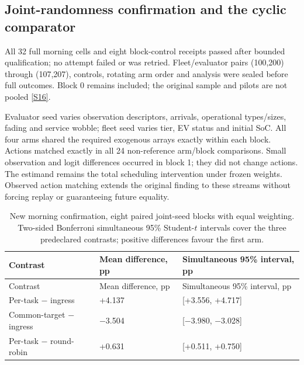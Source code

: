 \documentclass[11pt,a4paper]{article}
\begin{document}
\subsection{Joint-randomness confirmation and the cyclic comparator}\label{sec:3.7}

All 32 full morning cells and eight block-control receipts passed after bounded qualification; no attempt failed or was retried. Fleet/evaluator pairs (100,200) through (107,207), controls, rotating arm order and analysis were sealed before full outcomes. Block 0 remains included; the original sample and pilots are not pooled \hyperref[source-s16]{[S16]}.

Evaluator seed varies observation descriptors, arrivals, operational types/sizes, fading and service wobble; fleet seed varies tier, EV status and initial SoC. All four arms shared the required exogenous arrays exactly within each block. Actions matched exactly in all 24 non-reference arm/block comparisons. Small observation and logit differences occurred in block 1; they did not change actions. The estimand remains the total scheduling intervention under frozen weights. Observed action matching extends the original finding to these streams without forcing replay or guaranteeing future equality.

\begingroup
\small
\begin{xltabular}{\textwidth}{@{}YYY@{}}
\caption{New morning confirmation, eight paired joint-seed blocks with equal weighting. Two-sided Bonferroni simultaneous 95\% Student-$t$ intervals cover the three predeclared contrasts; positive differences favour the first arm.}\label{tab:13} \\
\toprule
Contrast & Mean difference, pp & Simultaneous 95\% interval, pp \\
\midrule\endfirsthead
\toprule
Contrast & Mean difference, pp & Simultaneous 95\% interval, pp \\
\midrule\endhead
\bottomrule\endfoot
Per-task \ensuremath{-} ingress & +4.137 & [+3.556, +4.717] \\
Common-target \ensuremath{-} ingress & \ensuremath{-}3.504 & [\ensuremath{-}3.980, \ensuremath{-}3.028] \\
Per-task \ensuremath{-} round-robin & +0.631 & [+0.511, +0.750] \\
\end{xltabular}
\endgroup
\end{document}
